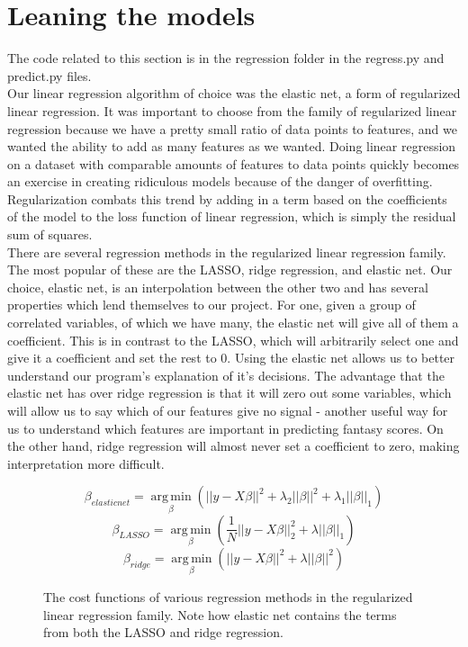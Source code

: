 \documentclass[12pt]{article}
\DeclareMathOperator*{\argmin}{arg\,min}
\renewcommand{\=}[1]{\stackrel{#1}{=}} %
\theoremstyle{definition}
\begin{document}
\section{Leaning the models} 
\label{mo}
The code related to this section is in the regression folder in the regress.py and predict.py files.  \\

Our linear regression algorithm of choice was the elastic net, a form of regularized linear regression.  It was important to choose from the family of regularized linear regression because we have a pretty small ratio of data points to features, and we wanted the ability to add as many features as we wanted.  Doing linear regression on a dataset with comparable amounts of features to data points quickly becomes an exercise in creating ridiculous models because of the danger of overfitting.  Regularization combats this trend by adding in a term based on the coefficients of the model to the loss function of linear regression, which is simply the residual sum of squares.  \\

There are several regression methods in the regularized linear regression family.  The most popular of these are the LASSO, ridge regression, and elastic net.  Our choice, elastic net, is an interpolation between the other two and has several properties which lend themselves to our project.  For one, given a group of correlated variables, of which we have many, the elastic net will give all of them a coefficient.  This is in contrast to the LASSO, which will arbitrarily select one and give it a coefficient and set the rest to 0.  Using the elastic net allows us to better understand our program's explanation of it's decisions.  The advantage that the elastic net has over ridge regression is that it will zero out some variables, which will allow us to say which of our features give no signal - another useful way for us to understand which features are important in predicting fantasy scores.  On the other hand, ridge regression will almost never set a coefficient to zero, making interpretation more difficult.  
\begin{figure}
$$\beta_{elastic net}  = \argmin\limits_\beta (||y - X \beta ||^2 + \lambda_2||\beta||^2 + \lambda_1||\beta||_1)$$
$$\beta_{LASSO}  = \argmin\limits_\beta (\frac{1}{N}||y - X \beta ||_2^2 + \lambda||\beta||_1)$$
$$\beta_{ridge}  = \argmin\limits_\beta (||y - X \beta ||^2 + \lambda||\beta||^2 )$$
\caption{The cost functions of various regression methods in the regularized linear regression family.  Note how elastic net contains the terms from both the LASSO and ridge regression.}

\end{figure}\\
\end{document}
